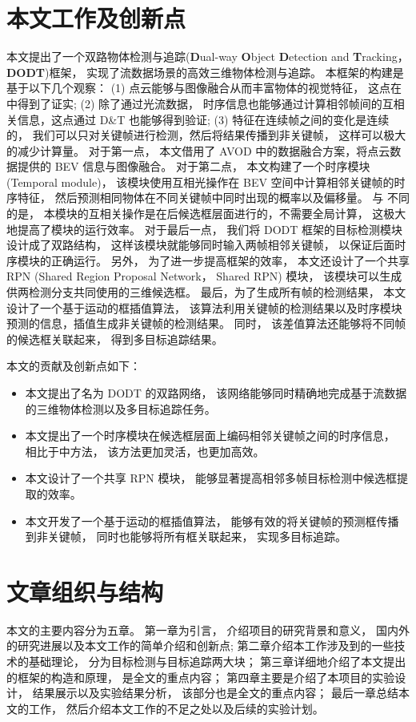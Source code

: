\section{本文工作及创新点}
\label{subsec:contribution}
本文提出了一个双路物体检测与追踪(\textbf{D}ual-way \textbf{O}bject \textbf{D}etection and \textbf{T}racking， \textbf{DODT})框架， 实现了流数据场景的高效三维物体检测与追踪。 本框架的构建是基于以下几个观察： (1) 点云能够与图像融合从而丰富物体的视觉特征， 这点在 \cite{chen2017multi,ku2018joint}中得到了证实; (2) 除了通过光流数据， 时序信息也能够通过计算相邻帧间的互相关信息，这点通过 D\&T\cite{feichtenhofer2017detect} 也能够得到验证; (3) 特征在连续帧之间的变化是连续的， 我们可以只对关键帧进行检测，然后将结果传播到非关键帧， 这样可以极大的减少计算量。 对于第一点， 本文借用了 AVOD\cite{ku2018joint} 中的数据融合方案，将点云数据提供的 BEV 信息与图像融合。 对于第二点， 本文构建了一个时序模块(Temporal module)， 该模块使用互相光操作在 BEV 空间中计算相邻关键帧的时序特征， 然后预测相同物体在不同关键帧中同时出现的概率以及偏移量。 与 \cite{feichtenhofer2017detect,dosovitskiy2015flownet} 不同的是， 本模块的互相关操作是在后候选框层面进行的，不需要全局计算， 这极大地提高了模块的运行效率。 对于最后一点， 我们将 DODT 框架的目标检测模块设计成了双路结构， 这样该模块就能够同时输入两帧相邻关键帧， 以保证后面时序模块的正确运行。 另外， 为了进一步提高框架的效率， 本文还设计了一个共享 RPN (Shared Region Proposal Network， Shared RPN) 模块， 该模块可以生成供两检测分支共同使用的三维候选框。 最后，为了生成所有帧的检测结果， 本文设计了一个基于运动的框插值算法， 该算法利用关键帧的检测结果以及时序模块预测的信息，插值生成非关键帧的检测结果。 同时， 该差值算法还能够将不同帧的候选框关联起来， 得到多目标追踪结果。

本文的贡献及创新点如下：
\begin{itemize}
	\item 本文提出了名为 DODT 的双路网络， 该网络能够同时精确地完成基于流数据的三维物体检测以及多目标追踪任务。
	\item 本文提出了一个时序模块在候选框层面上编码相邻关键帧之间的时序信息， 相比于\cite{feichtenhofer2017detect,dosovitskiy2015flownet}中方法， 该方法更加灵活，也更加高效。
	\item 本文设计了一个共享 RPN 模块， 能够显著提高相邻多帧目标检测中候选框提取的效率。
	\item 本文开发了一个基于运动的框插值算法， 能够有效的将关键帧的预测框传播到非关键帧， 同时也能够将所有框关联起来， 实现多目标追踪。
\end{itemize}


\section{文章组织与结构}
\label{subsec:structure}
本文的主要内容分为五章。 第一章为引言， 介绍项目的研究背景和意义， 国内外的研究进展以及本文工作的简单介绍和创新点; 第二章介绍本工作涉及到的一些技术的基础理论， 分为目标检测与目标追踪两大块； 第三章详细地介绍了本文提出的框架的构造和原理， 是全文的重点内容； 第四章主要是介绍了本项目的实验设计， 结果展示以及实验结果分析， 该部分也是全文的重点内容； 最后一章总结本文的工作， 然后介绍本文工作的不足之处以及后续的实验计划。 


\ifprint
	\newpage
	\thispagestyle{empty}
	\mbox{}
	
	\clearpage
	\setcounter{page}{10}
\fi